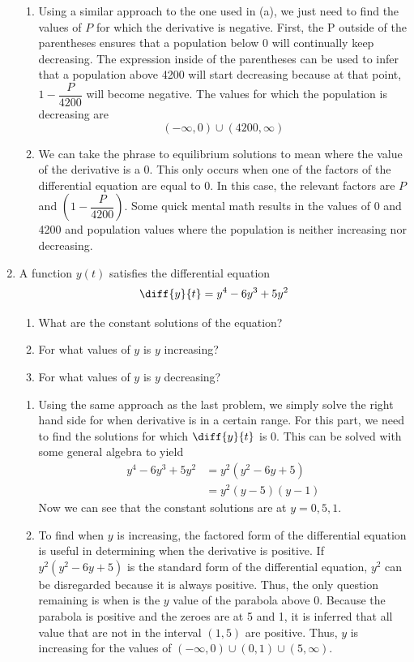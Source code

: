 \documentclass{article}
\begin{document}
\begin{enumerate}[label=\textbf{\arabic*.}]
\begin{enumerate}[label = (\alph*)]
\item Using a similar approach to the one used in (a), we just need to find the values of $P$ for which the derivative is negative. First, the P outside of the parentheses ensures that a population below 0 will continually keep decreasing. The expression inside of the parentheses can be used to infer that a population above 4200 will start decreasing because at that point, $1-\dfrac{P}{4200}$ will become negative. The values for which the population is decreasing are \[(-\infty, 0)\cup (4200,\infty)\]

\item We can take the phrase to equilibrium solutions to mean where the value of the derivative is a 0. This only occurs when one of the factors of the differential equation are equal to 0. In this case, the relevant factors are $P$ and $\left(1-\dfrac{P}{4200}\right)$. Some quick mental math results in the values of 0 and 4200 and population values where the population is neither increasing nor decreasing.
\end{enumerate}

\newpage

\item A function $y(t)$ satisfies the differential equation 
\[\diff{y}{t} = y^4-6y^3+5y^2\]
\begin{enumerate}[label = (\alph*)]
\item What are the constant solutions of the equation?
\item For what values of $y$ is $y$ increasing?
\item For what values of $y$ is $y$ decreasing?
\end{enumerate}


\vspace{5pt}
\begin{enumerate}[label = (\alph*)]
\item Using the same approach as the last problem, we simply solve the right hand side for when derivative is in a certain range. For this part, we need to find the solutions for which $\diff{y}{t}$ is 0. This can be solved with some general algebra to yield
\begin{align*}
y^4-6y^3+5y^2 &= y^2(y^2-6y+5)\\
&= y^2(y-5)(y-1)
\end{align*}
Now we can see that the constant solutions are at $y=0, 5, 1$. 

\item To find when $y$ is increasing, the factored form of the differential equation is useful in determining when the derivative is positive. If $y^2(y^2-6y+5)$ is the standard form of the differential equation, $y^2$ can be disregarded because it is always positive. Thus, the only question remaining is when is the $y$ value of the parabola above 0. Because the parabola is positive and the zeroes are at 5 and 1, it is inferred that all value that are not in the interval $(1,5)$ are positive. Thus, $y$ is increasing for the values of $(-\infty,0)\cup(0,1)\cup(5,\infty)$.


\end{enumerate}
\end{enumerate}
\end{document}
